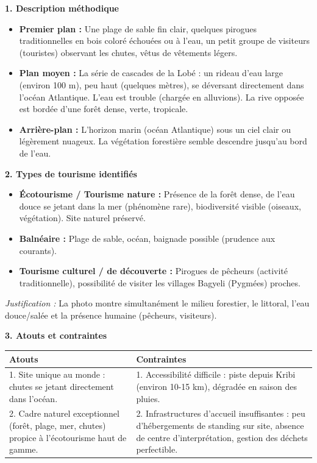 \documentclass[11pt]{article}
\begin{document}
\begin{corrige}
\textbf{1. Description méthodique}
\begin{itemize}
\item \textbf{Premier plan :} Une plage de sable fin clair, quelques pirogues traditionnelles en bois coloré échouées ou à l'eau, un petit groupe de visiteurs (touristes) observant les chutes, vêtus de vêtements légers.
\item \textbf{Plan moyen :} La série de cascades de la Lobé : un rideau d'eau large (environ 100 m), peu haut (quelques mètres), se déversant directement dans l'océan Atlantique. L'eau est trouble (chargée en alluvions). La rive opposée est bordée d'une forêt dense, verte, tropicale.
\item \textbf{Arrière-plan :} L'horizon marin (océan Atlantique) sous un ciel clair ou légèrement nuageux. La végétation forestière semble descendre jusqu'au bord de l'eau.
\end{itemize}

\textbf{2. Types de tourisme identifiés}
\begin{itemize}
\item \textbf{Écotourisme / Tourisme nature :} Présence de la forêt dense, de l'eau douce se jetant dans la mer (phénomène rare), biodiversité visible (oiseaux, végétation). Site naturel préservé.
\item \textbf{Balnéaire :} Plage de sable, océan, baignade possible (prudence aux courants).
\item \textbf{Tourisme culturel / de découverte :} Pirogues de pêcheurs (activité traditionnelle), possibilité de visiter les villages Bagyeli (Pygmées) proches.
\end{itemize}
\textit{Justification :} La photo montre simultanément le milieu forestier, le littoral, l'eau douce/salée et la présence humaine (pêcheurs, visiteurs).

\textbf{3. Atouts et contraintes}
\begin{center}
\begin{tabularx}{\linewidth}{|l|X|}\hline
\rowcolor{popblueL} \textbf{Atouts} & \textbf{Contraintes} \\ \hline
1. Site unique au monde : chutes se jetant directement dans l'océan. & 1. Accessibilité difficile : piste depuis Kribi (environ 10-15 km), dégradée en saison des pluies. \\ \hline
2. Cadre naturel exceptionnel (forêt, plage, mer, chutes) propice à l'écotourisme haut de gamme. & 2. Infrastructures d'accueil insuffisantes : peu d'hébergements de standing sur site, absence de centre d'interprétation, gestion des déchets perfectible. \\ \hline
\end{tabularx}
\end{center}


\end{corrige}
\end{document}
